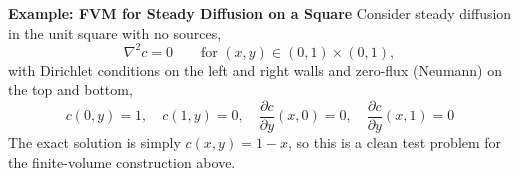 \begin{exampleBox}
\textbf{Example: FVM for Steady Diffusion on a Square}
    Consider steady diffusion in the unit square with no sources,
    \begin{equation}
        \nabla^2 c = 0 \qquad \text{for } (x,y)\in(0,1)\times(0,1),
    \end{equation}
    with Dirichlet conditions on the left and right walls and zero-flux (Neumann) on the top and bottom,
    \begin{equation}
        c(0,y)=1,\quad c(1,y)=0,\quad \frac{\partial c}{\partial y}(x,0)=0,\quad \frac{\partial c}{\partial y}(x,1)=0
        \label{eq:pde_dirichlet}
    \end{equation}
    The exact solution is simply $c(x,y)=1-x$, so this is a clean test problem for the finite-volume construction above.


\end{exampleBox}
